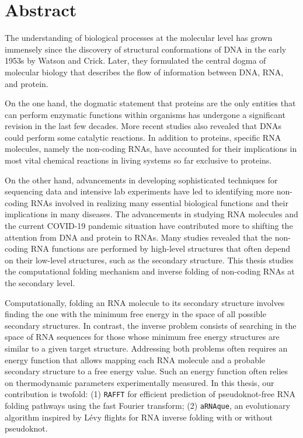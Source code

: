 \begingroup
\let\clearpage\relax
\let\cleardoublepage\relax
\let\cleardoublepage\relax

\chapter*{Abstract}
The understanding of biological processes at the molecular level has grown immensely since the discovery of structural conformations of DNA in the early 1953s by Watson and Crick. Later, they formulated the central dogma of molecular biology that describes the flow of information between DNA, RNA, and protein. 

On the one hand, the dogmatic statement that proteins are the only entities that can perform enzymatic functions within organisms has undergone a significant revision in the last few decades. More recent studies also revealed that DNAs could perform some catalytic reactions. In addition to proteins, specific RNA molecules, namely the non-coding RNAs, have accounted for their implications in most vital chemical reactions in living systems so far exclusive to proteins.

On the other hand, advancements in developing sophisticated techniques for sequencing data and intensive lab experiments have led to identifying more non-coding RNAs involved in realizing many essential biological functions and their implications in many diseases. The advancements in studying RNA molecules and the current COVID-19 pandemic situation have contributed more to shifting the attention from DNA and protein to RNAs. Many studies revealed that the non-coding RNA functions are performed by high-level structures that often depend on their low-level structures, such as the secondary structure. This thesis studies the computational folding mechanism and inverse folding of non-coding RNAs at the secondary level. 

Computationally, folding an RNA molecule to its secondary structure involves finding the one with the minimum free energy in the space of all possible secondary structures. In contrast, the inverse problem consists of searching in the space of RNA sequences for those whose minimum free energy structures are similar to a given target structure. Addressing both problems often requires an energy function that allows mapping each RNA molecule and a probable secondary structure to a free energy value. Such an energy function often relies on thermodynamic parameters experimentally measured. In this thesis, our contribution is twofold: (1) \texttt{RAFFT} for efficient prediction of pseudoknot-free RNA folding pathways using the fast Fourier transform; (2) \texttt{aRNAque}, an evolutionary algorithm inspired by Lévy flights for RNA inverse folding with or without pseudoknot. 

